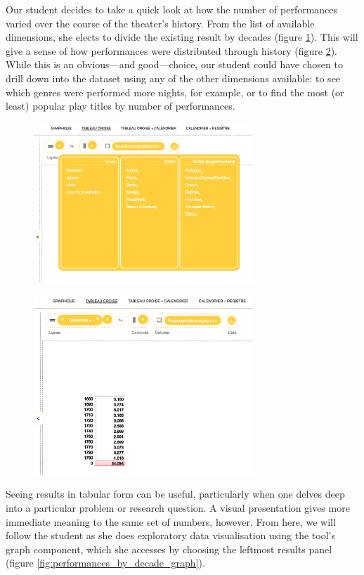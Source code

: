 \documentclass[	DIV=calc,%
							paper=a4,%
							fontsize=11pt,%
							twocolumn]{scrartcl}	 					%
\begin{document}
Our student decides to take a quick look at how the number of performances varied over the course of the theater’s history.  From the list of available dimensions, she elects to divide the existing result by decades (figure \ref{fig:dimensions}).  This will give a sense of how performances were distributed through history (figure \ref{fig:performances_by_decade}).  While this is an obvious—and good—choice, our student could have chosen to drill down into the dataset using any of the other dimensions available: to see which genres were performed more nights, for example, or to find the most (or least) popular play titles by number of performances.

\begin{figure}
  \centering
	\includegraphics[width=3.25in]{steps/dimensions.png}
	\caption{}
	\label{fig:dimensions}
\end{figure}

\begin{figure}
  \centering
	\includegraphics[width=3.25in]{steps/performances_by_decade.png}
	\caption{}
	\label{fig:performances_by_decade}
\end{figure}

Seeing results in tabular form can be useful, particularly when one delves deep into a particular problem or research question.  A visual presentation gives more immediate meaning to the same set of numbers, however.  From here, we will follow the student as she does exploratory data visualisation using the tool’s graph component, which she accesses by choosing the leftmost results panel (figure \ref{fig:performances_by_decade_graph}).
\end{document}
